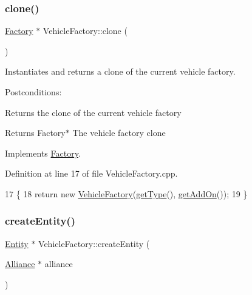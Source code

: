 \subsubsection{\texorpdfstring{clone()}{clone()}}
{\footnotesize\ttfamily \hyperlink{classFactory}{Factory} $\ast$ Vehicle\+Factory\+::clone (\begin{DoxyParamCaption}{ }\end{DoxyParamCaption})\hspace{0.3cm}{\ttfamily [virtual]}}



Instantiates and returns a clone of the current vehicle factory. 

Postconditions\+:
\begin{DoxyItemize}
\item Returns the clone of the current vehicle factory
\end{DoxyItemize}

\begin{DoxyReturn}{Returns}
Factory$\ast$ The vehicle factory clone 
\end{DoxyReturn}


Implements \hyperlink{classFactory}{Factory}.



Definition at line 17 of file Vehicle\+Factory.\+cpp.


\begin{DoxyCode}
17                                \{
18     \textcolor{keywordflow}{return} \textcolor{keyword}{new} \hyperlink{classVehicleFactory_a9bc9faf52aef1ad02193b3640b661f59}{VehicleFactory}(\hyperlink{classFactory_ac91051006ace7ec5bb6ecf0fe6d02d58}{getType}(), \hyperlink{classFactory_a994153930f59cafb280e91d5b100b5aa}{getAddOn}());
19 \}
\end{DoxyCode}
\mbox{\label{classVehicleFactory_a3f34221921fd58cf83fd9bc8e3d8798f}} 
\subsubsection{\texorpdfstring{create\+Entity()}{createEntity()}}
{\footnotesize\ttfamily \hyperlink{classEntity}{Entity} $\ast$ Vehicle\+Factory\+::create\+Entity (\begin{DoxyParamCaption}\item[{\hyperlink{classAlliance}{Alliance} $\ast$}]{alliance }\end{DoxyParamCaption})\hspace{0.3cm}{\ttfamily [virtual]}}




